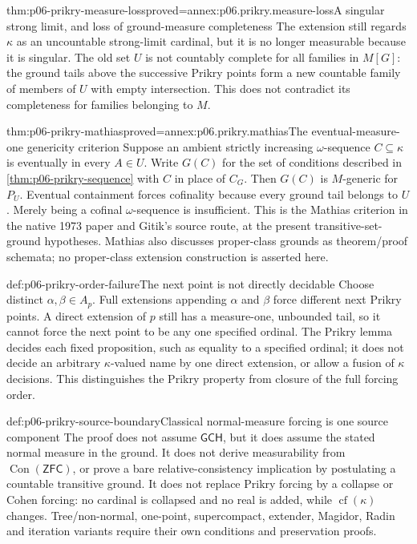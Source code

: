 \begin{hbcorollary}{thm:p06-prikry-measure-loss}{proved=annex:p06.prikry.measure-loss}{A singular strong limit, and loss of ground-measure completeness}
The extension still regards \(\kappa\) as an uncountable strong-limit
cardinal, but it is no longer measurable because it is singular.
The old set \(U\) is not countably complete for all families in
\(M[G]\): the ground tails above the successive Prikry points form
a new countable family of members of \(U\) with empty intersection.
This does not contradict its completeness for families belonging to \(M\).
\end{hbcorollary}

\begin{hbtheorem}{thm:p06-prikry-mathias}{proved=annex:p06.prikry.mathias}{The eventual-measure-one genericity criterion}
Suppose an ambient strictly increasing \(\omega\)-sequence \(C\subseteq\kappa\)
is eventually in every \(A\in U\). Write \(G(C)\) for the set of
conditions described in \cref{thm:p06-prikry-sequence} with \(C\) in place
of \(C_G\). Then \(G(C)\) is \(M\)-generic for \(P_U\).
Eventual containment forces cofinality because every ground tail belongs
to \(U\). Merely being a cofinal \(\omega\)-sequence is insufficient.
This is the Mathias criterion in the native 1973 paper and Gitik's
source route, at the present transitive-set-ground hypotheses. Mathias
also discusses proper-class grounds as theorem/proof schemata; no
proper-class extension construction is asserted here.
\end{hbtheorem}

\begin{hbexample}{def:p06-prikry-order-failure}{The next point is not directly decidable}
Choose distinct \(\alpha,\beta\in A_p\). Full extensions appending
\(\alpha\) and \(\beta\) force different next Prikry points. A direct
extension of \(p\) still has a measure-one, unbounded tail, so it cannot
force the next point to be any one specified ordinal. The Prikry lemma
decides each fixed proposition, such as equality to a specified ordinal;
it does not decide an arbitrary \(\kappa\)-valued name by one direct
extension, or allow a fusion of \(\kappa\) decisions. This distinguishes
the Prikry property from closure of the full forcing order.
\end{hbexample}

\begin{proofboundary}{def:p06-prikry-source-boundary}{Classical normal-measure forcing is one source component}
The proof does not assume \(\mathsf{GCH}\), but it does assume the stated
normal measure in the ground. It does not derive measurability from
\(\operatorname{Con}(\mathsf{ZFC})\), or prove a bare relative-consistency
implication by postulating a countable transitive ground. It does not
replace Prikry forcing by a collapse or Cohen forcing: no cardinal is
collapsed and no real is added, while \(\operatorname{cf}(\kappa)\) changes.
Tree/non-normal, one-point, supercompact, extender, Magidor, Radin and
iteration variants require their own conditions and preservation proofs.
\end{proofboundary}
